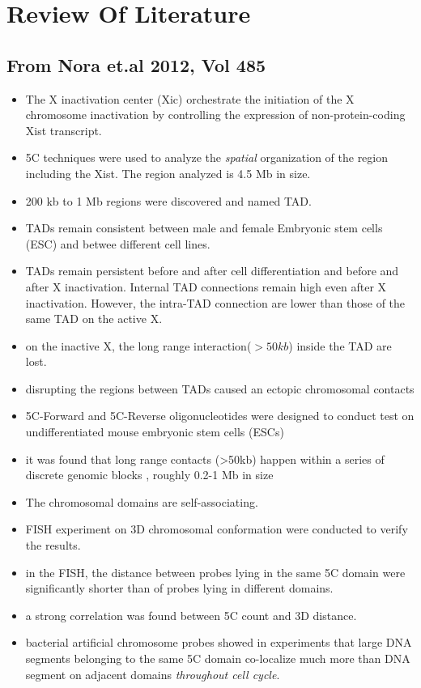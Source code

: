 \documentclass[12pt]{paper}
\begin{document}
\section{Review Of Literature}

\subsection{From Nora et.al 2012, Vol 485}
\begin{itemize}
\item The X inactivation center (Xic) orchestrate the initiation of the X chromosome inactivation by controlling the expression of non-protein-coding Xist transcript. 
\item 5C techniques were  used to analyze the \textit{spatial} organization of the region including the Xist. The region analyzed  is 4.5 Mb in size. 
\item 200 kb to 1 Mb regions were discovered and named TAD.
\item TADs remain consistent between male and female Embryonic stem cells (ESC) and betwee different cell lines.
\item TADs remain persistent before and after cell differentiation and before and after X inactivation. Internal TAD connections remain high even after X inactivation. However, the intra-TAD connection are lower than those of the same TAD on the active X.
\item on the inactive X, the long range interaction($>50kb$) inside the TAD are lost. 
\item disrupting the regions between TADs caused an ectopic chromosomal contacts 
\item 5C-Forward and 5C-Reverse oligonucleotides were designed to conduct test on undifferentiated mouse embryonic stem cells (ESCs)
\item it was found that long range contacts (>50kb) happen within a series of discrete genomic blocks , roughly 0.2-1 Mb in size 
\item The chromosomal domains are self-associating. 
\item FISH experiment on 3D chromosomal conformation were conducted to verify the results.
\item in the FISH, the distance between probes lying in the same 5C domain were significantly shorter than of probes lying in different domains. 
\item a strong correlation was found between 5C count and 3D distance. 
\item bacterial artificial chromosome probes showed in experiments that large DNA segments belonging to the same 5C domain co-localize much more than DNA segment on adjacent domains \textit{throughout cell cycle}. 

\end{itemize}
\end{document}
